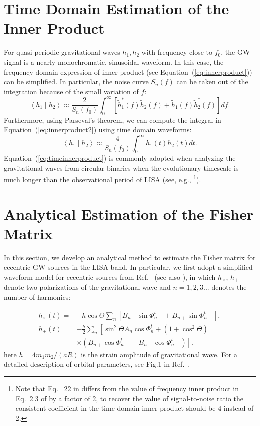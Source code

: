 \documentclass[%
 reprint,
 amsmath,amssymb,
 aps,
]{revtex4-2}
\begin{document}
\appendix
\section{Time Domain Estimation of the Inner Product}
For quasi-periodic gravitational waves $h_1,h_2$ with frequency close to $f_0$, the GW signal is a nearly monochromatic, sinusoidal waveform. In this case, the frequency-domain expression of inner product (see Equation~(\ref{eq:innerproduct})) can be simplified. In particular, the noise curve $S_n(f)$ can be taken out of the integration because of the small variation of $f$:
\begin{equation}
\left\langle h_1 \mid h_2\right\rangle \approx \frac{2}{S_n(f_0)} \int_0^{\infty}\left[\tilde{h}_1^*(f) \tilde{h}_2(f)+\tilde{h}_1(f) \tilde{h}_2^*(f)\right] d f . \label{eq:innerproduct2}
\end{equation}
Furthermore, using Parseval's theorem, we can compute the integral in Equation~(\ref{eq:innerproduct2}) using time domain waveforms:
\begin{equation}
\left\langle h_1 \mid h_2\right\rangle \approx \frac{4}{S_n(f_0)} \int_0^{\infty} h_1(t) h_2(t) d t .\label{eq:timeinnerproduct}
\end{equation}
Equation~(\ref{eq:timeinnerproduct}) is commonly adopted when analyzing the gravitational waves from circular binaries when the evolutionary timescale is much longer than the observational period of LISA (see, e.g., \citep{chen19,seto02}\footnote{Note that Eq.~ 22 in \citet{seto02} differs from the value of frequency inner product in Eq.~2.3 of \citet{Cutler+94} by a factor of 2, to recover the value of signal-to-noise ratio the consistent coefficient in the time domain inner product should be 4 instead of 2.}).

\section{Analytical Estimation of the Fisher Matrix}
\label{appendix:fisher}

In this section, we develop an analytical method to estimate the Fisher matrix for eccentric GW sources in the LISA band. In particular, we first adopt a simplified waveform model for eccentric sources from Ref.~\citep{Moreno+95} (see also \citep{Seto+01,mikoczi2012,Gondan_2018a}), in which $h_{\times},\,h_+ $ denote two polarizations of the gravitational wave and $n=1,2,3...$ denotes the number of harmonics:

\begin{align}
h_{\times}(t)= & -h \cos \Theta \sum_n\left[B_{n-} \sin \Phi_{n+}^t+B_{n+} \sin \Phi_{n-}^t\right], \label{eq:eccwaveform0}\\
h_{+}(t)= & -\frac{h}{2} \sum_n\left[\sin ^2 \Theta A_n \cos \Phi_n^t+\left(1+\cos ^2 \Theta\right)\right.  \nonumber\\
& \left.\times\left(B_{n+} \cos \Phi_{n-}^t-B_{n-} \cos \Phi_{n+}^t\right)\right] .\label{eq:eccwaveform}
\end{align}
here $h=4 m_1m_2/\left(a R\right)$ is the strain amplitude of gravitational wave. For a detailed description of orbital parameters, see Fig.1 in Ref.~\citep{mikoczi2012}. 
\end{document}
